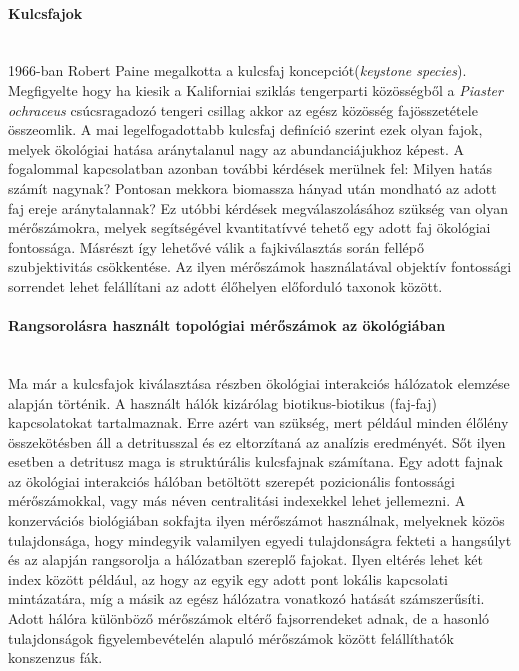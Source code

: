 \documentclass[a4paper,12pt]{article}
\begin{document}
	 \paragraph{Kulcsfajok} \mbox{}\\ %
	 1966-ban Robert Paine megalkotta a kulcsfaj koncepciót(\textit{keystone species}). Megfigyelte hogy ha kiesik a Kaliforniai sziklás tengerparti közösségből a \textit{Piaster ochraceus} csúcsragadozó tengeri csillag akkor az egész közösség fajösszetétele összeomlik. A mai legelfogadottabb kulcsfaj definíció szerint ezek olyan fajok, melyek ökológiai hatása aránytalanul nagy az abundanciájukhoz képest. A fogalommal kapcsolatban azonban további kérdések merülnek fel: Milyen hatás számít nagynak? Pontosan mekkora biomassza hányad után mondható az adott faj ereje aránytalannak? \cite{new_zeland} Ez utóbbi kérdések megválaszolásához szükség van olyan mérőszámokra, melyek segítségével kvantitatívvé tehető egy adott faj ökológiai fontossága. Másrészt így lehetővé válik a fajkiválasztás során fellépő szubjektivitás csökkentése. Az ilyen mérőszámok használatával objektív fontossági sorrendet lehet felállítani az adott élőhelyen előforduló taxonok között. \cite{jordan_comparison} 
	 
	 \paragraph{Rangsorolásra használt topológiai mérőszámok az ökológiában} \mbox{}\\
	 Ma már a kulcsfajok kiválasztása részben ökológiai interakciós hálózatok elemzése alapján történik. A használt hálók kizárólag biotikus-biotikus (faj-faj) kapcsolatokat tartalmaznak. Erre azért van szükség, mert például minden élőlény összekötésben áll a detritusszal és ez eltorzítaná az analízis eredményét. Sőt ilyen esetben a detritusz maga is struktúrális kulcsfajnak számítana. Egy adott fajnak az ökológiai interakciós hálóban betöltött szerepét pozicionális fontossági mérőszámokkal, vagy más néven centralitási indexekkel lehet jellemezni. A konzervációs biológiában sokfajta ilyen mérőszámot használnak, melyeknek közös tulajdonsága, hogy mindegyik valamilyen egyedi tulajdonságra fekteti a hangsúlyt és az alapján rangsorolja a hálózatban szereplő fajokat. Ilyen eltérés lehet két index között például, az hogy az egyik egy adott pont lokális kapcsolati mintázatára, míg a másik az egész hálózatra vonatkozó hatását számszerűsíti. Adott hálóra különböző mérőszámok eltérő fajsorrendeket adnak, de a hasonló tulajdonságok figyelembevételén alapuló mérőszámok között felállíthatók konszenzus fák. \cite{jordan_comparison}
	 
\end{document}
